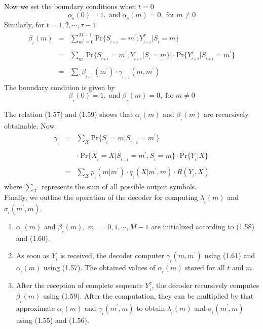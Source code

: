 Now we set the boundary conditions when $t=0$
\begin{equation}
\alpha_{_0}(0)=1,\;\mathrm{and}\;\alpha_{_{0}}(m)=0,\;\mathrm{for}\;m\neq 0
\end{equation}
Similarly, for $t=1,2,\cdots,\tau-1$
\begin{eqnarray}
\begin{array}{lll}
\beta_{_{t}}(m)&=&\sum\limits_{m^{'}=0}^{M-1}\mathrm{Pr}\{S_{_{t+1}}=m^{'};Y_{_{t+1}}^{\tau}\vert S_{_{t}}=m\} \\ \\
&=&\sum\limits_{m^{'}}^{}\mathrm{Pr}\{S_{_{t+1}}=m^{'};Y_{_{t+1}}\vert S_{_{t}}=m\} \vert \cdot \mathrm{Pr}\{Y_{_{t+2}}^{\tau}\vert S_{_{t+1}}=m^{'}\} \\ \\
&=&\sum\limits_{'}^{}\beta_{_{t+1}}(m^{'})\cdot \gamma_{_{t+1}}(m,m^{'})
\end{array}
\end{eqnarray}
The boundary condition is given by
\begin{equation}
\beta_{_{\tau}}(0)=1,\;\mathrm{and}\;\beta_{_{\tau}}(m)=0,\;\mathrm{for}\;m\neq 0
\end{equation}

The relation (1.57) and (1.59) shows that $\alpha_{_{t}}(m)$ and $\beta_{_{\tau}}(m)$ are recursively obtainable. Now
\begin{eqnarray}
\begin{array}{lll}
\gamma_{_{t}}&=&\sum\limits_{\mathcal{X}}^{}\mathrm{Pr}\{S_{_t}=m\vert S_{_{t-1}}=m^{'}\}\\ \\
&& \cdot\; \mathrm{Pr}\{X_{_{t}}=X\vert S_{_{t-1}}=m^{'},S_{_{t}}=m\}\cdot \mathrm{Pr}\{Y_{_{t}}\vert X\} \\ \\
&=&\sum\limits_{\mathcal{X}}p_{_{t}}(m\vert m^{'})\cdot q_{_t}(X\vert m^{'},m)\cdot R(Y_{_{t}},X)
\end{array}
\end{eqnarray}
where $\sum\limits_{\mathcal{X}}$ represents the sum of all possible output symbols.\\

Finally, we outline the operation of the decoder for computing $\lambda_{_{t}}(m)$ and $\sigma_{_{t}}(m^{'},m)$.

\begin{enumerate}
\item $\alpha_{_{0}}(m)$ and $\beta_{_{\tau}}(m),\;m\;=\;0,1,\cdots,M-1$ are initialized according to (1.58) and (1.60). \\
\item As soon as $Y_{_{t}}$ is received, the decoder computer $\gamma_{_{t}}(m,m^{'})$ using (1.61) and $\alpha_{_{t}}(m)$ using (1.57). The obtained values of $\alpha_{_{t}}(m)$ stored for all $t$ and $m$. \\
\item After the reception of complete sequence $Y_{_{1}}^{\tau}$, the decoder recursively computes $\beta_{_{t}}(m)$ using (1.59). After the computation, they can be multiplied by that approximate $\alpha_{_{t}}(m)$ and $\gamma_{_{t}}(m^{'},m)$ to obtain $\lambda_{_{t}}(m)$ and $\sigma_{_{t}}(m^{'},m)$ using (1.55) and (1.56).
\end{enumerate}
